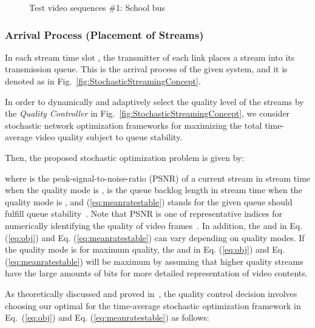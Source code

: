 \documentclass[conference]{IEEEtran}
\begin{document}
\begin{figure*}[t!]
	\centering
	\caption{Test video sequences \#1: School bus}
	\label{fig:sim1}
\end{figure*}

\subsubsection{Arrival Process (Placement of Streams)}\label{sec:streaming-arrival}
In each stream time slot , the transmitter of each link places a stream into its transmission queue.
This is the arrival process of the given system, and it is denoted as  in Fig.~\ref{fig:StochasticStreamingConcept}.

In order to dynamically and adaptively select the quality level of the streams by the \textit{Quality Controller} in Fig.~\ref{fig:StochasticStreamingConcept},
we consider stochastic network optimization frameworks for maximizing the total time-average video quality subject to queue stability.

Then, the proposed stochastic optimization problem is given by:

where
     is the peak-signal-to-noise-ratio (PSNR) of a current stream in stream time  when the quality mode is ,
     is the queue backlog length in stream time  when the quality mode is , and
    (\ref{eq:meanratestable}) stands for the given queue should fulfill queue stability~\cite{book2010neely}.
Note that PSNR is one of representative indices for numerically identifying the quality of video frames~\cite{tbc2013kim}.
In addition, the  and  in Eq. (\ref{eq:obj}) and Eq. (\ref{eq:meanratestable}) can vary depending on quality modes.
If the quality mode is for maximum quality, the  and  in Eq. (\ref{eq:obj}) and Eq. (\ref{eq:meanratestable}) will be maximum by assuming that higher quality streams have the large amounts of bits for more detailed representation of video contents.

As theoretically discussed and proved in~\cite{ton2015kim},
the quality control decision involves choosing our optimal  for the time-average stochastic optimization framework in Eq.~(\ref{eq:obj}) and Eq. (\ref{eq:meanratestable}) as follows:
\end{document}
